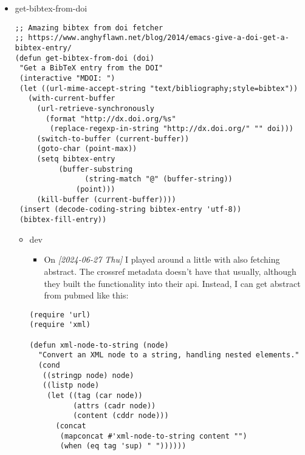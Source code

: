 \documentclass{article}
\begin{document}
\begin{itemize}
\begin{itemize}
\begin{verbatim}
\end{verbatim}
\begin{itemize}
\item get-bibtex-from-doi
\label{sec:org9756c10}
\begin{verbatim}
;; Amazing bibtex from doi fetcher
;; https://www.anghyflawn.net/blog/2014/emacs-give-a-doi-get-a-bibtex-entry/
(defun get-bibtex-from-doi (doi)
 "Get a BibTeX entry from the DOI"
 (interactive "MDOI: ")
 (let ((url-mime-accept-string "text/bibliography;style=bibtex"))
   (with-current-buffer
     (url-retrieve-synchronously
       (format "http://dx.doi.org/%s"
        (replace-regexp-in-string "http://dx.doi.org/" "" doi)))
     (switch-to-buffer (current-buffer))
     (goto-char (point-max))
     (setq bibtex-entry
          (buffer-substring
                (string-match "@" (buffer-string))
              (point)))
     (kill-buffer (current-buffer))))
 (insert (decode-coding-string bibtex-entry 'utf-8))
 (bibtex-fill-entry))

\end{verbatim}
\begin{itemize}
\item dev
\label{sec:orga60fd23}
\begin{itemize}
\item On \textit{[2024-06-27 Thu] } I played around a little with also fetching abstract. The crossref metadata doesn't have that usually, although they built the functionality into their api. Instead, I can get abstract from pubmed like this:
\end{itemize}

\begin{verbatim}
(require 'url)
(require 'xml)

(defun xml-node-to-string (node)
  "Convert an XML node to a string, handling nested elements."
  (cond
   ((stringp node) node)
   ((listp node)
    (let ((tag (car node))
          (attrs (cadr node))
          (content (cddr node)))
      (concat
       (mapconcat #'xml-node-to-string content "")
       (when (eq tag 'sup) " "))))))


\end{verbatim}
\end{itemize}
\end{itemize}
\end{itemize}
\end{itemize}
\end{document}
